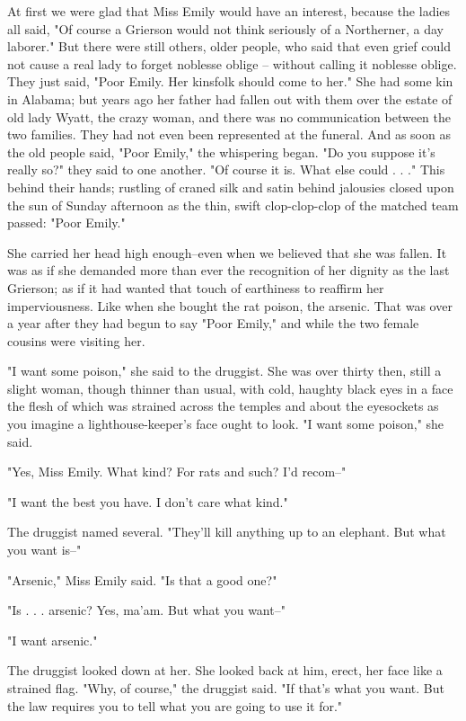 \documentclass[10pt,a4paper]{article}
\begin{document}
At first we were glad that Miss Emily would have an interest, because the ladies all said, "Of course a Grierson would not think seriously of a Northerner, a day laborer." But there were still others, older people, who said that even grief could not cause a real lady to forget noblesse oblige -- without calling it noblesse oblige. They just said, "Poor Emily. Her kinsfolk should come to her." She had some kin in Alabama; but years ago her father had fallen out with them over the estate of old lady Wyatt, the crazy woman, and there was no communication between the two families. They had not even been represented at the funeral. And as soon as the old people said, "Poor Emily," the whispering began. "Do you suppose it's really so?" they said to one another. "Of course it is. What else could . . ." This behind their hands; rustling of craned silk and satin behind jalousies closed upon the sun of Sunday afternoon as the thin, swift clop-clop-clop of the matched team passed: "Poor Emily."

She carried her head high enough--even when we believed that she was fallen. It was as if she demanded more than ever the recognition of her dignity as the last Grierson; as if it had wanted that touch of earthiness to reaffirm her imperviousness. Like when she bought the rat poison, the arsenic. That was over a year after they had begun to say "Poor Emily," and while the two female cousins were visiting her.

"I want some poison," she said to the druggist. She was over thirty then, still a slight woman, though thinner than usual, with cold, haughty black eyes in a face the flesh of which was strained across the temples and about the eyesockets as you imagine a lighthouse-keeper's face ought to look. "I want some poison," she said.

"Yes, Miss Emily. What kind? For rats and such? I'd recom--"

"I want the best you have. I don't care what kind."

The druggist named several. "They'll kill anything up to an elephant. But what you want is--"

"Arsenic," Miss Emily said. "Is that a good one?"

"Is . . . arsenic? Yes, ma'am. But what you want--"

"I want arsenic."

The druggist looked down at her. She looked back at him, erect, her face like a strained flag. "Why, of course," the druggist said. "If that's what you want. But the law requires you to tell what you are going to use it for."
\end{document}
